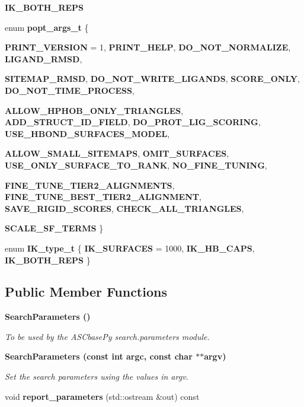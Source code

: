 \begin{CompactItemize}
\item 
\textbf{IK\_\-BOTH\_\-REPS}\label{classASCbase_1_1SearchParameters_c267aed4ea246dc936ccd5b47b71712d1aa6526aee8d82d030cda47ac9831efb}

\item 
enum \textbf{popt\_\-args\_\-t} \{ \par
\textbf{PRINT\_\-VERSION} =  1, 
\textbf{PRINT\_\-HELP}, 
\textbf{DO\_\-NOT\_\-NORMALIZE}, 
\textbf{LIGAND\_\-RMSD}, 
\par
\textbf{SITEMAP\_\-RMSD}, 
\textbf{DO\_\-NOT\_\-WRITE\_\-LIGANDS}, 
\textbf{SCORE\_\-ONLY}, 
\textbf{DO\_\-NOT\_\-TIME\_\-PROCESS}, 
\par
\textbf{ALLOW\_\-HPHOB\_\-ONLY\_\-TRIANGLES}, 
\textbf{ADD\_\-STRUCT\_\-ID\_\-FIELD}, 
\textbf{DO\_\-PROT\_\-LIG\_\-SCORING}, 
\textbf{USE\_\-HBOND\_\-SURFACES\_\-MODEL}, 
\par
\textbf{ALLOW\_\-SMALL\_\-SITEMAPS}, 
\textbf{OMIT\_\-SURFACES}, 
\textbf{USE\_\-ONLY\_\-SURFACE\_\-TO\_\-RANK}, 
\textbf{NO\_\-FINE\_\-TUNING}, 
\par
\textbf{FINE\_\-TUNE\_\-TIER2\_\-ALIGNMENTS}, 
\textbf{FINE\_\-TUNE\_\-BEST\_\-TIER2\_\-ALIGNMENT}, 
\textbf{SAVE\_\-RIGID\_\-SCORES}, 
\textbf{CHECK\_\-ALL\_\-TRIANGLES}, 
\par
\textbf{SCALE\_\-SF\_\-TERMS}
 \}
\item 
enum \textbf{IK\_\-type\_\-t} \{ \textbf{IK\_\-SURFACES} =  1000, 
\textbf{IK\_\-HB\_\-CAPS}, 
\textbf{IK\_\-BOTH\_\-REPS}
 \}
\end{CompactItemize}
\subsection*{Public Member Functions}
\begin{CompactItemize}
\item 
\bf{Search\-Parameters} ()\label{classASCbase_1_1SearchParameters_a08c1e2d66f1c849ba1fb003a6bc6b7f}

\begin{CompactList}\small\item\em To be used by the ASCbase\-Py search.parameters module. \item\end{CompactList}\item 
\bf{Search\-Parameters} (const int argc, const char $\ast$$\ast$argv)\label{classASCbase_1_1SearchParameters_1acc5cc86e0834742971c7a66033c951}

\begin{CompactList}\small\item\em Set the search parameters using the values in argv. \item\end{CompactList}\item 
void \textbf{report\_\-parameters} (std::ostream \&out) const \label{classASCbase_1_1SearchParameters_c3a3ee055bce67d5d055a7a0a939c860}

\end{CompactItemize}
